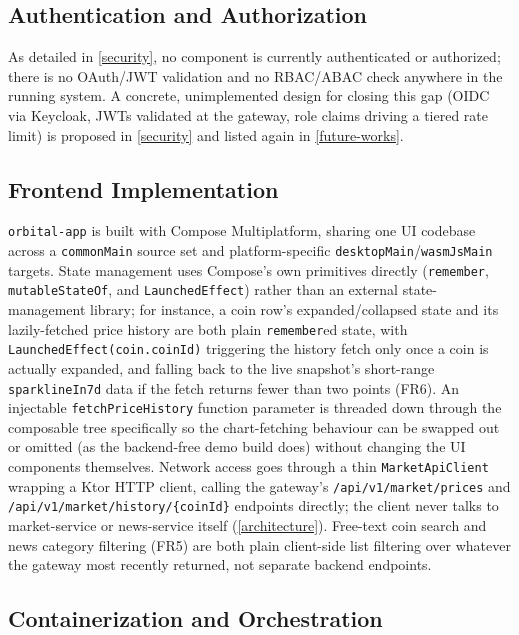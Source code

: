 \documentclass{scrartcl}
\begin{document}
\subsection{Authentication and Authorization}\label{impl-auth}

As detailed in \cref{security}, no component is currently authenticated or authorized; there is
no OAuth/JWT validation and no RBAC/ABAC check anywhere in the running system. A concrete,
unimplemented design for closing this gap (OIDC via Keycloak, JWTs validated at the gateway, role
claims driving a tiered rate limit) is proposed in \cref{security} and listed again in
\cref{future-works}.

\subsection{Frontend Implementation}\label{impl-frontend}

\texttt{orbital-app} is built with Compose Multiplatform, sharing one UI codebase across a
\texttt{commonMain} source set and platform-specific \texttt{desktopMain}/\texttt{wasmJsMain}
targets. State management uses Compose's own primitives directly (\texttt{remember},
\texttt{mutableStateOf}, and \texttt{LaunchedEffect}) rather than an external state-management
library; for instance, a coin row's expanded/collapsed state and its lazily-fetched price history
are both plain \texttt{remember}ed state, with \texttt{LaunchedEffect(coin.coinId)} triggering
the history fetch only once a coin is actually expanded, and falling back to the live snapshot's
short-range \texttt{sparklineIn7d} data if the fetch returns fewer than two points (FR6). An
injectable \texttt{fetchPriceHistory} function parameter is threaded down through the composable
tree specifically so the chart-fetching behaviour can be swapped out or omitted (as the
backend-free demo build does) without changing the UI components themselves. Network access goes
through a thin \texttt{MarketApiClient} wrapping a Ktor HTTP client, calling the gateway's
\texttt{/api/v1/market/prices} and \texttt{/api/v1/market/history/\{coinId\}} endpoints directly;
the client never talks to market-service or news-service itself (\cref{architecture}). Free-text
coin search and news category filtering (FR5) are both plain client-side list filtering over
whatever the gateway most recently returned, not separate backend endpoints.

\subsection{Containerization and Orchestration}\label{impl-containers}
\end{document}

